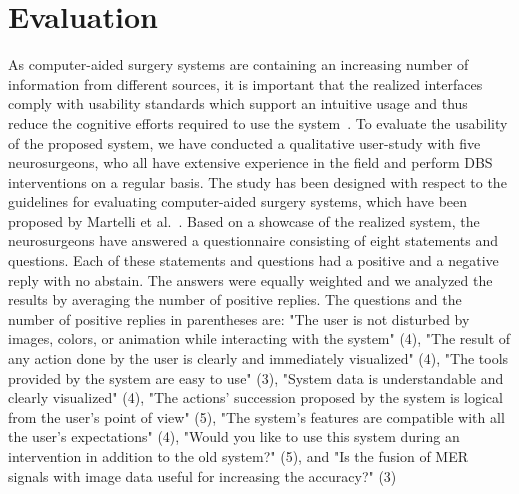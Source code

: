 \documentclass[journal]{vgtc}                %
\begin{document}
\section{Evaluation}\label{sec:evaluation}
As computer-aided surgery systems are containing an increasing number of information from different sources, it is important that the realized interfaces comply with usability standards which support an intuitive usage and thus reduce the cognitive efforts required to use the system~\cite{Visarius1997,Martelli2003}. To evaluate the usability of the proposed system, we have conducted a qualitative user-study with five neurosurgeons, who all have extensive experience in the field and perform DBS interventions on a regular basis. The study has been designed with respect to the guidelines for evaluating computer-aided surgery systems, which have been proposed by Martelli et al.~\cite{Martelli2003}. Based on a showcase of the realized system, the neurosurgeons have answered a questionnaire consisting of eight statements and questions. Each of these statements and questions had a positive and a negative reply with no abstain. The answers were equally weighted and we analyzed the results by averaging the number of positive replies. The questions and the number of positive replies in parentheses are: "The user is not disturbed by images, colors, or animation while interacting with the system" (4), "The result of any action done by the user is clearly and immediately visualized" (4), "The tools provided by the system are easy to use" (3), "System data is understandable and clearly visualized" (4), "The actions' succession proposed by the system is logical from the user's point of view" (5), "The system's features are compatible with all the user's expectations" (4), "Would you like to use this system during an intervention in addition to the old system?" (5), and "Is the fusion of MER signals with image data useful for increasing the accuracy?" (3)



\end{document}
